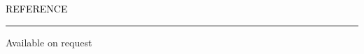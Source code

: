 \documentclass{resume} %
\renewenvironment{rSection}[1]{
	\sectionskip
	\textcolor{Black}{\MakeUppercase{#1}}
	\sectionlineskip
	\hrule
	\begin{list}{}{
			\setlength{\leftmargin}{1.5em}
		}
		\item[]
	}{
	\end{list}
}
\begin{document}
%		
	
	
	\begin{rSection}{Reference}
	Available on request
				
	\end{rSection}
		
	
\end{document}
